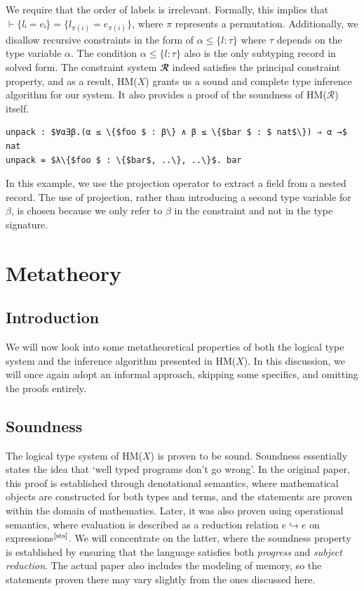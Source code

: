\documentclass[runningheads]{llncs}
\newcommand{\hmx}{HM($X$)}
\newcommand{\hmr}{HM($\mathcal{R}$)}
\begin{document}
We require that the order of labels is irrelevant. Formally, this
implies that $⊢ \{lᵢ = eᵢ\} = \{l_{π(i)} = e_{π(i)}\}$, where $π$ represents a
permutation. Additionally, we disallow recursive constraints in the form of $α
  ≤ \{l : τ\}$ where $τ$ depends on the type variable $α$. The condition $α
  ≤ \{l : τ\}$ also is the only subtyping record in solved form.
The constraint system $𝓡$ indeed satisfies the principal constraint property,
and as a result, \hmx{} grants us a sound and complete type inference algorithm
for our system. It also provides a proof of the soundness of \hmr{} itself.

\begin{example}
  \begin{lstlisting}
unpack : $∀α∃β.(α ≤ \{$foo $ : β\} ∧ β ≤ \{$bar $ : $ nat$\}) ⇒ α →$ nat
unpack = $λ\{$foo $ : \{$bar$, ..\}, ..\}$. bar
  \end{lstlisting}
\end{example}
In this example, we use the projection operator to extract a field from a
nested record. The use of projection, rather than introducing a second type
variable for $β$, is chosen because we only refer to $β$ in the constraint and
not in the type signature.

\section{Metatheory}

\subsection{Introduction}
We will now look into some metatheoretical properties of both the logical type
system and the inference algorithm presented in \hmx{}.
In this discussion, we will once again adopt an informal approach, skipping
some specifics, and omitting the proofs entirely.

\subsection{Soundness}
The logical type system of \hmx{} is proven to be sound. Soundness essentially
states the idea that `well typed programs don't go wrong'.
In the original paper,
this proof is established through denotational semantics, where mathematical
objects are constructed for both types and terms, and the statements are proven
within the domain of mathematics. Later, it was also proven using operational
semantics, where evaluation is described as a reduction relation $e ↪ e$ on
expressions$^\text{\cite{sts}}$.
We will concentrate on the latter, where the soundness property is established
by ensuring that the language satisfies both \emph{progress} and \emph{subject
  reduction}.
The actual paper also includes the modeling of memory, so the statements
proven there may vary slightly from the ones discussed here.
\end{document}
